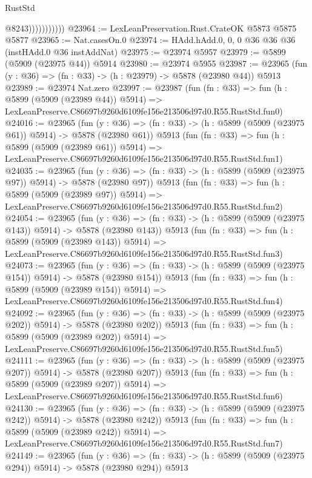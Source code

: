 \begin{lexlean}{RustStd}
\begin{coremodule}
{{                          @8243)))))))))))
@23964 := LexLeanPreservation.Rust.CrateOK @5873 @5875 @5877
@23965 := Nat.casesOn.{0}
@23974 := HAdd.hAdd.{0, 0, 0} @36 @36 @36 (instHAdd.{0} @36 instAddNat)
@23975 := @23974 @5957
@23979 := @5899 (@5909 (@23975 @44)) @5914
@23980 := @23974 @5955
@23987 := @23965 (fun (y : @36) => (fn : @33) -> (h : @23979) -> @5878 (@23980 @44)) @5913
@23989 := @23974 Nat.zero
@23997 := @23987
    (fun (fn : @33) =>
    fun (h : @5899 (@5909 (@23989 @44)) @5914) =>
    LexLeanPreserve.C86697b9260d6109fe156e213506d97d0.R55.RustStd.fun0)
@24016 := @23965
    (fun (y : @36) => (fn : @33) -> (h : @5899 (@5909 (@23975 @61)) @5914) -> @5878 (@23980 @61))
    @5913
    (fun (fn : @33) =>
    fun (h : @5899 (@5909 (@23989 @61)) @5914) =>
    LexLeanPreserve.C86697b9260d6109fe156e213506d97d0.R55.RustStd.fun1)
@24035 := @23965
    (fun (y : @36) => (fn : @33) -> (h : @5899 (@5909 (@23975 @97)) @5914) -> @5878 (@23980 @97))
    @5913
    (fun (fn : @33) =>
    fun (h : @5899 (@5909 (@23989 @97)) @5914) =>
    LexLeanPreserve.C86697b9260d6109fe156e213506d97d0.R55.RustStd.fun2)
@24054 := @23965
    (fun (y : @36) => (fn : @33) -> (h : @5899 (@5909 (@23975 @143)) @5914) -> @5878 (@23980 @143))
    @5913
    (fun (fn : @33) =>
    fun (h : @5899 (@5909 (@23989 @143)) @5914) =>
    LexLeanPreserve.C86697b9260d6109fe156e213506d97d0.R55.RustStd.fun3)
@24073 := @23965
    (fun (y : @36) => (fn : @33) -> (h : @5899 (@5909 (@23975 @154)) @5914) -> @5878 (@23980 @154))
    @5913
    (fun (fn : @33) =>
    fun (h : @5899 (@5909 (@23989 @154)) @5914) =>
    LexLeanPreserve.C86697b9260d6109fe156e213506d97d0.R55.RustStd.fun4)
@24092 := @23965
    (fun (y : @36) => (fn : @33) -> (h : @5899 (@5909 (@23975 @202)) @5914) -> @5878 (@23980 @202))
    @5913
    (fun (fn : @33) =>
    fun (h : @5899 (@5909 (@23989 @202)) @5914) =>
    LexLeanPreserve.C86697b9260d6109fe156e213506d97d0.R55.RustStd.fun5)
@24111 := @23965
    (fun (y : @36) => (fn : @33) -> (h : @5899 (@5909 (@23975 @207)) @5914) -> @5878 (@23980 @207))
    @5913
    (fun (fn : @33) =>
    fun (h : @5899 (@5909 (@23989 @207)) @5914) =>
    LexLeanPreserve.C86697b9260d6109fe156e213506d97d0.R55.RustStd.fun6)
@24130 := @23965
    (fun (y : @36) => (fn : @33) -> (h : @5899 (@5909 (@23975 @242)) @5914) -> @5878 (@23980 @242))
    @5913
    (fun (fn : @33) =>
    fun (h : @5899 (@5909 (@23989 @242)) @5914) =>
    LexLeanPreserve.C86697b9260d6109fe156e213506d97d0.R55.RustStd.fun7)
@24149 := @23965
    (fun (y : @36) => (fn : @33) -> (h : @5899 (@5909 (@23975 @294)) @5914) -> @5878 (@23980 @294))
    @5913
}}
\end{coremodule}
\end{lexlean}
